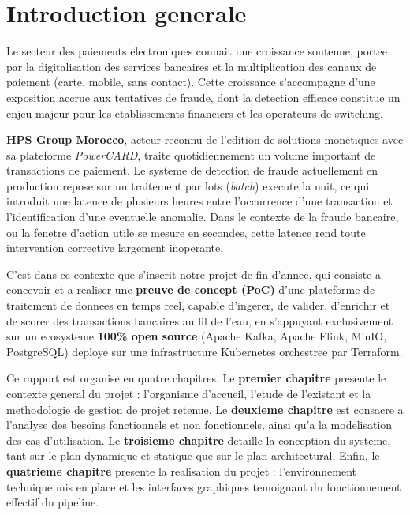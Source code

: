 \newpage

\clearpage
{}
\setcounter{page}{1}

\chapter*{Introduction generale}

Le secteur des paiements electroniques connait une croissance soutenue, portee par la
digitalisation des services bancaires et la multiplication des canaux de paiement
(carte, mobile, sans contact). Cette croissance s'accompagne d'une exposition accrue
aux tentatives de fraude, dont la detection efficace constitue un enjeu majeur pour les
etablissements financiers et les operateurs de switching.

\textbf{HPS Group Morocco}, acteur reconnu de l'edition de solutions monetiques avec sa
plateforme \textit{PowerCARD}, traite quotidiennement un volume important de transactions
de paiement. Le systeme de detection de fraude actuellement en production repose sur un
traitement par lots (\textit{batch}) execute la nuit, ce qui introduit une latence de
plusieurs heures entre l'occurrence d'une transaction et l'identification d'une eventuelle
anomalie. Dans le contexte de la fraude bancaire, ou la fenetre d'action utile se mesure
en secondes, cette latence rend toute intervention corrective largement inoperante.

C'est dans ce contexte que s'inscrit notre projet de fin d'annee, qui consiste a concevoir
et a realiser une \textbf{preuve de concept (PoC)} d'une plateforme de traitement de
donnees en temps reel, capable d'ingerer, de valider, d'enrichir et de scorer des
transactions bancaires au fil de l'eau, en s'appuyant exclusivement sur un ecosysteme
\textbf{100\% open source} (Apache Kafka, Apache Flink, MinIO, PostgreSQL) deploye sur
une infrastructure Kubernetes orchestree par Terraform.

Ce rapport est organise en quatre chapitres. Le \textbf{premier chapitre} presente le
contexte general du projet : l'organisme d'accueil, l'etude de l'existant et la
methodologie de gestion de projet retenue. Le \textbf{deuxieme chapitre} est consacre a
l'analyse des besoins fonctionnels et non fonctionnels, ainsi qu'a la modelisation des cas
d'utilisation. Le \textbf{troisieme chapitre} detaille la conception du systeme, tant sur
le plan dynamique et statique que sur le plan architectural. Enfin, le \textbf{quatrieme
chapitre} presente la realisation du projet : l'environnement technique mis en place et
les interfaces graphiques temoignant du fonctionnement effectif du pipeline.

\newpage
